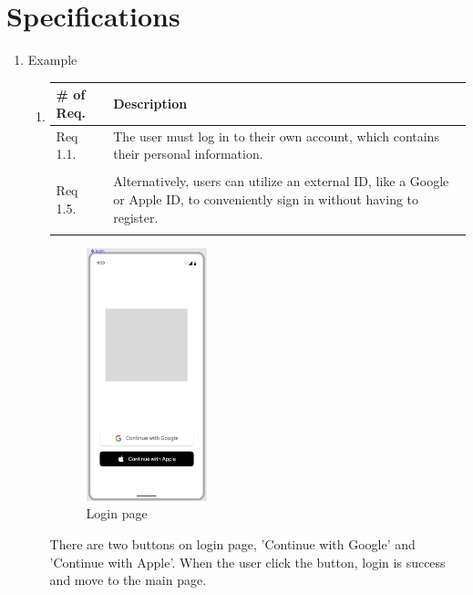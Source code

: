 \section{\Large{Specifications}}
\begin{enumerate}[label=\arabic*.]

    \item {\large{Example}}
    \begin{enumerate}[label*={\arabic*.},ref=\theenumi.\arabic*]
    \setlength{\itemindent}{0.5cm}
        \item
            \begin{table}[H]
            \center
                \begin{tabular}{m{1.4cm} m{5.5cm}}
                \toprule
                \# of Req. & Description\\
                \midrule
                Req 1.1. & The user must log in to their own account, which contains their personal information.\\\\
                Req 1.5. & Alternatively, users can utilize an external ID, like a Google or Apple ID, to conveniently sign in without having to register.\\\\
                \bottomrule
                \end{tabular}
            \end{table}
            
                \begin{figure}[ht]
                    \begin{center}
                    \includegraphics[width=3.5cm]{imgs/specification/login_page.png}
                    \caption{Login page}
                    \renewcommand{\thefigure}{\thesubsection.\arabic{figure}}
                    \end{center}
                \end{figure}
            There are two buttons on login page, 'Continue with Google' and 'Continue with Apple'. When the user click the button, login is success and move to the main page.\\\\


\end{enumerate}
\end{enumerate}
